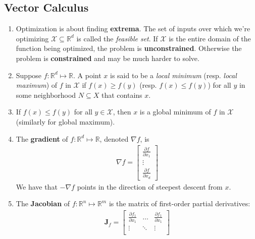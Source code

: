 \documentclass[10pt]{article}
\begin{document}
\begin{multicols}{2}
\begin{addmargin}[0.8em]{0.5em}
    \subsection{Vector Calculus}
    \vspace{-0.2cm}
    \begin{enumerate}[label=(\alph*)]
        \item Optimization is about finding \textbf{extrema}. The set of inputs over which we’re optimizing $\mathcal{X} \subseteq \mathbb{R}^d$ is called the \textit{feasible set}. If $\mathcal{X}$ is the entire domain of the function being optimized, the problem is \textbf{unconstrained}. Otherwise the problem is \textbf{constrained} and may be much harder to solve.
        \item Suppose $f : \mathbb{R}^d \mapsto \mathbb{R}$. A point $x$ is said to be a \textit{local minimum} (resp. \textit{local maximum}) of $f$ in $\mathcal{X}$ if $f(x) \geq f(y)$ (resp. $f(x) \leq f(y)$) for all $y$ in some neighborhood $N \subseteq X$ that contains $x$. 
        \item If $f(x) \leq f(y)$ for all $y \in \mathcal{X}$, then $x$ is a global minimum of $f$ in $\mathcal{X}$ (similarly for global maximum). 
        \item The \textbf{gradient} of $f : \mathbb{R}^d \mapsto \mathbb{R}$, denoted $\nabla f$, is
        \begin{align*}
        \nabla f = 
        \begin{bmatrix} 
        \frac{\partial f}{\partial x_1} \\ \vdots \\ \frac{\partial f}{\partial x_d}
        \end{bmatrix}
        \end{align*}
        We have that $-\nabla f$ points in the direction of steepest descent from $x$.
        \item The \textbf{Jacobian} of $f: \mathbb{R}^n \mapsto \mathbb{R}^m$ is the matrix of first-order partial derivatives:
        \begin{align*}
        \mathbf{J}_f = 
        \begin{bmatrix}
        \frac{\partial f_1}{\partial x_1} & \hdots & \frac{\partial f_1}{\partial x_1} \\
        \vdots & \ddots & \vdots \\

\end{bmatrix}
\end{align*}
\end{enumerate}
\end{addmargin}
\end{multicols}
\end{document}
